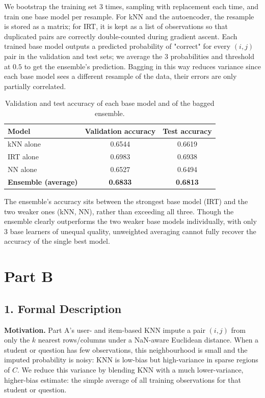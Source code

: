 \documentclass[11pt, letterpaper]{article}
\begin{document}
We bootstrap the training set 3 times, sampling with replacement each time, and train one base model per resample. For kNN and the autoencoder, the resample is stored as a matrix; for IRT, it is kept as a list of observations so that duplicated pairs are correctly double-counted during gradient ascent. Each trained base model outputs a predicted probability of "correct" for every $(i,j)$ pair in the validation and test sets; we average the 3 probabilities and threshold at $0.5$ to get the ensemble's prediction. Bagging in this way reduces variance since each base model sees a different resample of the data, their errors are only partially correlated.

\begin{table}[H]
\centering
\caption{Validation and test accuracy of each base model and of the bagged ensemble.}
\begin{tabular}{lcc}
\toprule
Model & Validation accuracy & Test accuracy \\
\midrule
kNN alone & 0.6544 & 0.6619 \\
IRT alone & 0.6983 & 0.6938 \\
NN alone & 0.6527 & 0.6494 \\
\textbf{Ensemble (average)} & \textbf{0.6833} & \textbf{0.6813} \\
\bottomrule
\end{tabular}
\end{table}

The ensemble's accuracy sits between the strongest base model (IRT) and the two weaker ones (kNN, NN), rather than exceeding all three. Though the ensemble clearly outperforms the two weaker base models individually, with only 3 base learners of unequal quality, unweighted averaging cannot fully recover the accuracy of the single best model.

\clearpage
\section*{Part B}
 
\subsection*{1. Formal Description}

\textbf{Motivation.} Part A's user- and item-based KNN impute a pair $(i,j)$ from only the $k$ nearest rows/columns under a NaN-aware Euclidean distance. When a student or question has few observations, this neighbourhood is small and the imputed probability is noisy: KNN is low-bias but high-variance in sparse regions of $C$. We reduce this variance by blending KNN with a much lower-variance, higher-bias estimate: the simple average of all training observations for that student or question.
\end{document}
